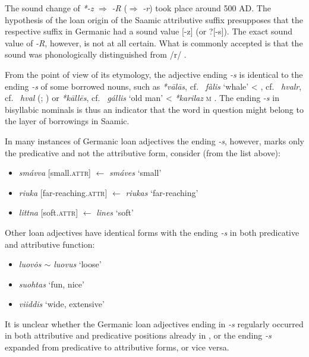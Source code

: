 {\begin{itemize}
\end{itemize}
The sound change of  \textit{*-z} $\Rightarrow$  \textit{-R} ($\Rightarrow$  \textit{-r}) took place around 500 AD. The hypothesis of the loan origin of the Saamic attributive suffix presupposes that the respective suffix in Germanic had a sound value [-z] (or ?[-s]). The exact sound value of \textit{-R}, however, is not at all certain. What is commonly accepted is that the sound was phonologically distinguished from /r/ \citep{skold1954}.

From the point of view of its etymology, the adjective ending \textit{-s} is identical to the ending \textit{-s} of some borrowed  nouns, such as  \textit{*vālās}, cf.~ \textit{fàlis} ‘whale’ < , cf.~ \textit{hvalr}, cf.~ \textit{hval} (\citealt[144]{qvigstad1893}; \citealt[144–145]{lehtiranta1989}) or  \textit{*kāllēs}, cf.~ \textit{gállis} ‘old man’ <  \textit{*karilaz} \textsc{m} \cite[44–45]{lehtiranta1989}. The ending \textit{-s} in bisyllabic nominals is thus an indicator that the word in question might belong to the layer of  borrowings in Saamic.

In many instances of Germanic loan adjectives the ending \textit{-s}, however, marks only the predicative and not the attributive form, consider (from the list above):
\begin{itemize}
\item {} \textit{smávva} [small.\textsc{attr}] $\leftarrow$ \textit{smáves} ‘small’
\item {} \textit{riuka} [far-reaching.\textsc{attr}] $\leftarrow$ \textit{riukas} ‘far-reaching’
\item {} \textit{littna} [soft.\textsc{attr}] $\leftarrow$ \textit{lines} ‘soft’
\end{itemize}
Other loan adjectives have identical forms with the ending \textit{-s} in both predicative and attributive function:
\begin{itemize}
\item {} \textit{luov\.{o}s $\sim$ luovus} ‘loose'
\item {} \textit{suohtas} ‘fun, nice'
\item {} \textit{viiddis} ‘wide, extensive'
\end {itemize}
It is unclear whether the Germanic loan adjectives ending in \textit{-s} regularly occurred in both attributive and predicative positions already in , or the ending \textit{-s} expanded from predicative to attributive forms, or vice versa.

}
